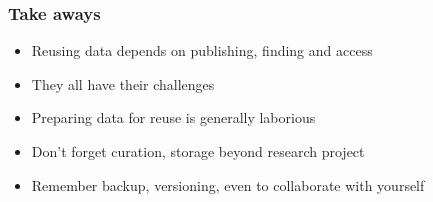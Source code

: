 \documentclass{beamer}
\begin{document}
\begin{frame}
  \frametitle{Take aways}
  
  \begin{itemize}
    \item Reusing data depends on publishing, finding and access
    \item They all have their challenges
    \item Preparing data for reuse is generally laborious
    \item Don't forget curation, storage beyond research project
    \item Remember backup, versioning, even to collaborate with yourself
  \end{itemize}
\end{frame}
\end{document}

